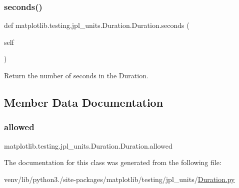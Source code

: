 \subsubsection{\texorpdfstring{seconds()}{seconds()}}
{\footnotesize\ttfamily def matplotlib.\+testing.\+jpl\+\_\+units.\+Duration.\+Duration.\+seconds (\begin{DoxyParamCaption}\item[{}]{self }\end{DoxyParamCaption})}

\begin{DoxyVerb}Return the number of seconds in the Duration.\end{DoxyVerb}
 

\subsection{Member Data Documentation}
\mbox{\label{classmatplotlib_1_1testing_1_1jpl__units_1_1Duration_1_1Duration_ab0114bb00527a0a190dc32fd518ee02b}} 
\subsubsection{\texorpdfstring{allowed}{allowed}}
{\footnotesize\ttfamily matplotlib.\+testing.\+jpl\+\_\+units.\+Duration.\+Duration.\+allowed\hspace{0.3cm}{\ttfamily [static]}}



The documentation for this class was generated from the following file\+:\begin{DoxyCompactItemize}
\item 
venv/lib/python3./site-\/packages/matplotlib/testing/jpl\+\_\+units/\hyperlink{Duration_8py}{Duration.\+py}\end{DoxyCompactItemize}
